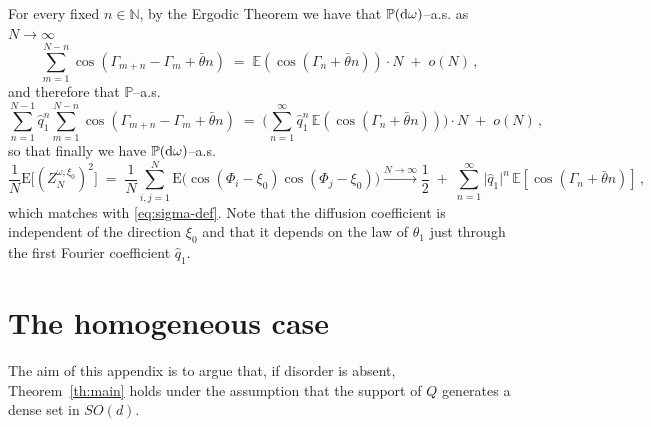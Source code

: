 \documentclass[a4paper,reqno,11pt]{amsart}
\numberwithin{equation}{section}
\newcommand{\bbE}{{\ensuremath{\mathbb E}} }
\newcommand{\bbP}{{\ensuremath{\mathbb P}} }
\newcommand{\go}{\omega}
\newcommand{\dd}{\text{\rm d}}             %
\newcommand{\N}{\mathbb{N}}
\def\bE{\ensuremath{\bs{\mathrm{E}}}}
\def\bs{\boldsymbol}
\begin{document}
For every fixed $n\in\N$, by the Ergodic Theorem we have that $\bbP(\dd \go)$--a.s. as $N\to\infty$
\begin{equation}
    \sum_{m=1}^{N-n} \cos(\Gamma_{m+n} - \Gamma_m+\bar \theta n) \;=\; \bbE(\cos(\Gamma_n+\bar \theta n))
    \cdot N \;+\; o(N) \,,
\end{equation}
and therefore that $\bbP$--a.s.
\begin{equation}
    \sum_{n=1}^{N-1} \hat q_1^n \sum_{m=1}^{N-n} \cos(\Gamma_{m+n} 
    - \Gamma_m + \bar \theta n) \;=\;
    \Bigg( \sum_{n=1}^\infty \hat q_1^n \,\bbE\left(\cos(\Gamma_n+\bar \theta n)\right) \Bigg) \cdot N \;+\; o(N)\,,
\end{equation}
so that finally we have $\bbP(\dd \go)$--a.s.
\begin{equation}
\label{eq:diffusion}
    \frac 1 N \bE\big[ (Z^{\go,\xi_0}_N)^2 \big]  \;=\;
    \frac{1}{N}\sum_{i,j = 1}^N \bE \big( \cos(\Phi_i-\xi_0)
    \cos(\Phi_j-\xi_0) \big) \stackrel{ N\to\infty }\longrightarrow
    \frac 12 \;+\; \sum_{n=1}^\infty \vert \hat q_1\vert^n \,\bbE[\cos(\Gamma_n +\bar \theta n)]\,,
\end{equation}
which matches with \eqref{eq:sigma-def}.
Note that the diffusion coefficient is independent of the direction
$\xi_0$ and that it depends on the law of
$\theta_1$ just through the first Fourier coefficient $\hat q_1$.


\medskip

\section{The homogeneous case}
\label{app:hom}

The aim of this appendix is to argue that, if disorder
is absent, Theorem~\ref{th:main} holds under the assumption
that the support of $Q$ generates a dense set in $SO(d)$. 
\end{document}
